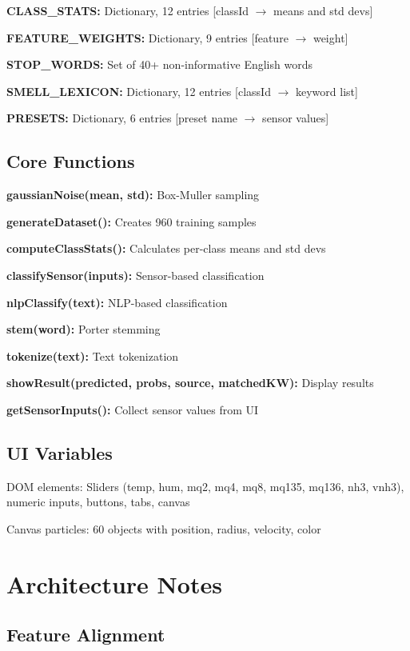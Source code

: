 \documentclass[10pt]{article}
\begin{document}
\textbf{CLASS\_STATS:} Dictionary, 12 entries [classId $\to$ means and std devs]

\textbf{FEATURE\_WEIGHTS:} Dictionary, 9 entries [feature $\to$ weight]

\textbf{STOP\_WORDS:} Set of 40+ non-informative English words

\textbf{SMELL\_LEXICON:} Dictionary, 12 entries [classId $\to$ keyword list]

\textbf{PRESETS:} Dictionary, 6 entries [preset name $\to$ sensor values]

\subsection{Core Functions}

\textbf{gaussianNoise(mean, std):} Box-Muller sampling

\textbf{generateDataset():} Creates 960 training samples

\textbf{computeClassStats():} Calculates per-class means and std devs

\textbf{classifySensor(inputs):} Sensor-based classification

\textbf{nlpClassify(text):} NLP-based classification

\textbf{stem(word):} Porter stemming

\textbf{tokenize(text):} Text tokenization

\textbf{showResult(predicted, probs, source, matchedKW):} Display results

\textbf{getSensorInputs():} Collect sensor values from UI

\subsection{UI Variables}

DOM elements: Sliders (temp, hum, mq2, mq4, mq8, mq135, mq136, nh3, vnh3), numeric inputs, buttons, tabs, canvas

Canvas particles: 60 objects with position, radius, velocity, color

\section{Architecture Notes}

\subsection{Feature Alignment}
\end{document}

